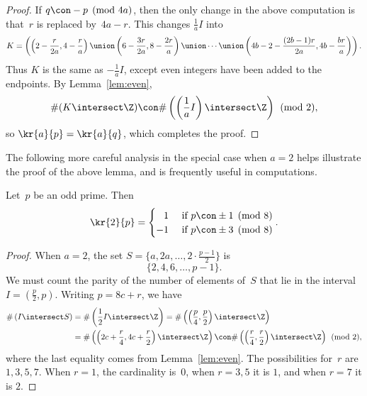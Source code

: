 \documentclass[11pt]{report}
\begin{document}
\begin{proof}
  If $q\con -p\pmod{4a}$, then the only change in the above computation
  is that~$r$ is replaced by~$4a-r$.  This changes $\frac{1}{a}I$ into
  $$K =
    \left(\left(2-\frac{r}{2a},4-\frac{r}{a}\right)
    \union
    \left(6-\frac{3r}{2a},8-\frac{2r}{a}\right)
    \union
    \cdots
    \union
    \left(4b-2-\frac{(2b-1)r}{2a},4b-\frac{br}{a}\right)
    \right).$$
  Thus $K$ is the same as $-\frac{1}{a}I$, except even integers
  have been added to the endpoints.  By Lemma~\ref{lem:even},
  $$\#(K\intersect \Z)\con \#\left(\left(\frac{1}{a}I\right)\intersect\Z\right)\pmod{2},$$
  so $\kr{a}{p} = \kr{a}{q}$, which completes the proof.
\end{proof}

The following more careful analysis in the special case when $a=2$
helps illustrate the proof of the above lemma, and is frequently
useful in computations.
\begin{proposition}\label{prop:p2}
  Let~$p$ be an odd prime.  Then
  $$
    \kr{2}{p} = \begin{cases} \hfill1 & \text{ if } p\con \pm 1\pmod{8} \\
              -1      & \text{ if } p\con \pm 3\pmod{8}
    \end{cases}.
  $$
\end{proposition}
\begin{proof}
  When $a=2$, the set $S = \{a,2a,\ldots,2\cdot\frac{p-1}{2}\}$ is
  $$
    \{ 2, 4, 6, \ldots, p-1 \}.
  $$
  We must count the parity of the number of elements of~$S$
  that lie in the interval $I=(\frac{p}{2}, p)$.
  Writing $p=8c+r$, we have
  \begin{align*}
    \#\left(I\intersect S\right) & =\#\left(\frac{1}{2}I \intersect \Z\right)
    =\#\left(\left(\frac{p}{4},\frac{p}{2}\right)\intersect \Z\right)                                       \\
                                 & =\#\left(\left(2c+\frac{r}{4}, 4c+\frac{r}{2}\right)\intersect \Z\right)
    \con \#\left(\left(\frac{r}{4}, \frac{r}{2}\right)\intersect \Z\right)
    \pmod{2},
  \end{align*}
  where the last equality comes from Lemma~\ref{lem:even}.
  The possibilities for~$r$ are $1,3,5,7$.  When $r=1$, the cardinality
  is~$0$, when $r=3, 5$ it is $1$, and when $r=7$ it is $2$.
\end{proof}
\end{document}
